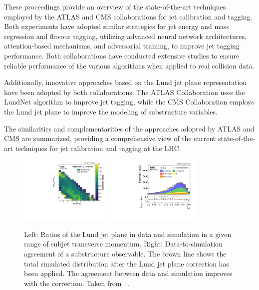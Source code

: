 \documentclass[a4paper,11pt]{article}
\begin{document}
These proceedings provide an overview of the state-of-the-art techniques employed by the ATLAS and CMS collaborations
for jet calibration and tagging. Both experiments have adopted similar strategies for jet energy and mass regression
and flavour tagging, utilizing advanced neural network architectures, attention-based mechanisms, and
adversarial training, to improve jet tagging performance. Both collaborations have conducted extensive studies
to ensure reliable performance of the various algorithms when applied to real collision data.

Additionally, innovative approaches based on the Lund jet plane representation have been adopted by both collaborations.
The ATLAS Collaboration uses the LundNet algorithm to improve jet tagging, while the CMS Collaboration employs the Lund jet plane to improve
the modeling of substructure variables.

The similarities and complementarities of the approaches adopted by ATLAS and CMS are summarized,
providing a comprehensive view of the current state-of-the-art techniques for jet calibration and tagging at the LHC.

\begin{figure}[t]
\centering
\includegraphics[width=0.40\textwidth]{figure_CMS_LPR_ratio.pdf}
\includegraphics[width=0.40\textwidth]{figure_CMS_LPR_substructure.pdf}
\caption{
Left: Ratios of the Lund jet plane in data and simulation in a given range of subjet transverse momentum.
Right: Data-to-simulation agreement of a substructure observable. The brown line shows the total simulated distribution after the Lund jet plane correction has been applied. The agreement between data and simulation improves with the correction. Taken from ~\cite{CMS-DP-2023-046}.
}
\label{fig:CMS_LPR}
\end{figure}



\end{document}

